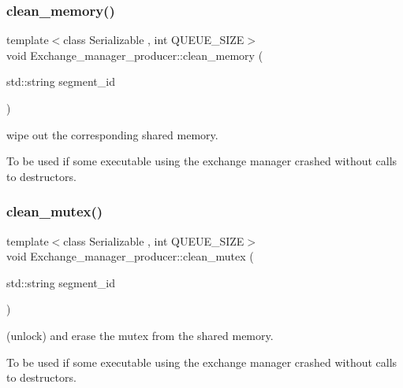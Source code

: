 \subsubsection{\texorpdfstring{clean\+\_\+memory()}{clean\_memory()}}
{\footnotesize\ttfamily template$<$class Serializable , int Q\+U\+E\+U\+E\+\_\+\+S\+I\+ZE$>$ \\
void Exchange\+\_\+manager\+\_\+producer\+::clean\+\_\+memory (\begin{DoxyParamCaption}\item[{std\+::string}]{segment\+\_\+id }\end{DoxyParamCaption})\hspace{0.3cm}{\ttfamily [static]}}



wipe out the corresponding shared memory. 

To be used if some executable using the exchange manager crashed without calls to destructors. \mbox{\label{classshared__memory_1_1Exchange__manager__producer_af98fe4321e1fd280b509f5dfd2cf4a5b}} 
\subsubsection{\texorpdfstring{clean\+\_\+mutex()}{clean\_mutex()}}
{\footnotesize\ttfamily template$<$class Serializable , int Q\+U\+E\+U\+E\+\_\+\+S\+I\+ZE$>$ \\
void Exchange\+\_\+manager\+\_\+producer\+::clean\+\_\+mutex (\begin{DoxyParamCaption}\item[{std\+::string}]{segment\+\_\+id }\end{DoxyParamCaption})\hspace{0.3cm}{\ttfamily [static]}}



(unlock) and erase the mutex from the shared memory. 

To be used if some executable using the exchange manager crashed without calls to destructors. \mbox{\label{classshared__memory_1_1Exchange__manager__producer_a733c4c3f794e10590569f94e3f320201}} 
